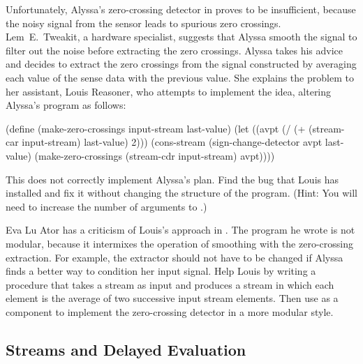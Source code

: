 \begin{exercise}
	\label{Exercise 3.75}
	Unfortunately, Alyssa’s zero-crossing detector in  proves to be insufficient, because the noisy signal from the sensor leads to spurious zero crossings.
	Lem~E.~Tweakit, a hardware specialist, suggests that Alyssa smooth the signal to filter out the noise before extracting the zero crossings.
	Alyssa takes his advice and decides to extract the zero crossings from the signal constructed by averaging each value of the sense data with the previous value.
	She explains the problem to her assistant, Louis Reasoner, who attempts to implement the idea, altering Alyssa’s program as follows:
	\begin{scheme}
	  (define (make-zero-crossings input-stream last-value)
	    (let ((avpt (/ (+ (stream-car input-stream)
	                      last-value)
	                   2)))
	      (cons-stream
	       (sign-change-detector avpt last-value)
	       (make-zero-crossings
	        (stream-cdr input-stream) avpt))))
	\end{scheme}
	This does not correctly implement Alyssa’s plan.
	Find the bug that Louis has installed and fix it without changing the structure of the program.
	(Hint:
	You will need to increase the number of arguments to .)
\end{exercise}



\begin{exercise}
	\label{Exercise 3.76}
	Eva Lu Ator has a criticism of Louis’s approach in .
	The program he wrote is not modular, because it intermixes the operation of smoothing with the zero-crossing extraction.
	For example, the extractor should not have to be changed if Alyssa finds a better way to condition her input signal.
	Help Louis by writing a procedure  that takes a stream as input and produces a stream in which each element is the average of two successive input stream elements.
	Then use  as a component to implement the zero-crossing detector in a more modular style.
\end{exercise}



\subsection{Streams and Delayed Evaluation}
\label{Section 3.5.4}

